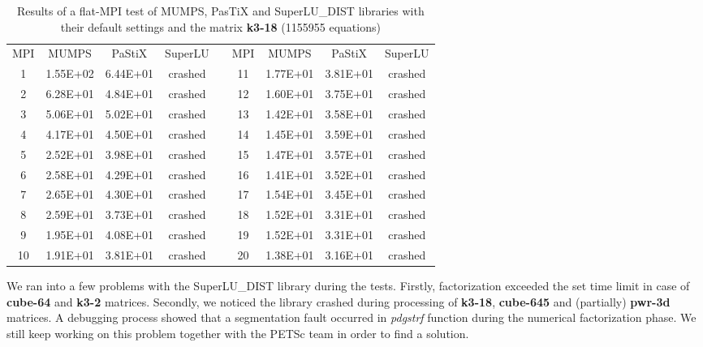 \begin{table}[h!]
\centering
\begin{tabular}{|c|c|c|c|l|c|c|c|c|}
\cline{1-4} \cline{6-9}
MPI & MUMPS    & PaStiX   & SuperLU &  & MPI & MUMPS    & PaStiX   & SuperLU \\ \cline{1-4} \cline{6-9} 
1   & 1.55E+02 & 6.44E+01 & crashed &  & 11  & 1.77E+01 & 3.81E+01 & crashed \\ \cline{1-4} \cline{6-9} 
2   & 6.28E+01 & 4.84E+01 & crashed &  & 12  & 1.60E+01 & 3.75E+01 & crashed \\ \cline{1-4} \cline{6-9} 
3   & 5.06E+01 & 5.02E+01 & crashed &  & 13  & 1.42E+01 & 3.58E+01 & crashed \\ \cline{1-4} \cline{6-9} 
4   & 4.17E+01 & 4.50E+01 & crashed &  & 14  & 1.45E+01 & 3.59E+01 & crashed \\ \cline{1-4} \cline{6-9} 
5   & 2.52E+01 & 3.98E+01 & crashed &  & 15  & 1.47E+01 & 3.57E+01 & crashed \\ \cline{1-4} \cline{6-9} 
6   & 2.58E+01 & 4.29E+01 & crashed &  & 16  & 1.41E+01 & 3.52E+01 & crashed \\ \cline{1-4} \cline{6-9} 
7   & 2.65E+01 & 4.30E+01 & crashed &  & 17  & 1.54E+01 & 3.45E+01 & crashed \\ \cline{1-4} \cline{6-9} 
8   & 2.59E+01 & 3.73E+01 & crashed &  & 18  & 1.52E+01 & 3.31E+01 & crashed \\ \cline{1-4} \cline{6-9} 
9   & 1.95E+01 & 4.08E+01 & crashed &  & 19  & 1.52E+01 & 3.31E+01 & crashed \\ \cline{1-4} \cline{6-9} 
10  & 1.91E+01 & 3.81E+01 & crashed &  & 20  & 1.38E+01 & 3.16E+01 & crashed \\ \cline{1-4} \cline{6-9} 
\end{tabular}
\caption{Results of a flat-MPI test of MUMPS, PasTiX and SuperLU\_DIST libraries with their default settings and the matrix \textbf{k3-18} (1155955 equations)}
\label{table:lc-k3-18-result}
\end{table}



We ran into a few problems with the SuperLU\_DIST library during the tests. Firstly, factorization exceeded the set time limit in case of \textbf{cube-64} and \textbf{k3-2} matrices. Secondly, we noticed the library crashed during processing of \textbf{k3-18}, \textbf{cube-645} and (partially) \textbf{pwr-3d} matrices. A debugging process showed that a segmentation fault occurred in \textit{pdgstrf} function during the numerical factorization phase. We still keep working on this problem together with the PETSc team in order to find a solution. \\

